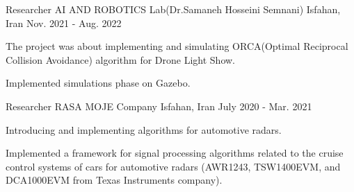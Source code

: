 

\begin{cventries}



  \cventry
    {Researcher} %
    {AI AND ROBOTICS Lab(Dr.‪Samaneh Hosseini Semnani)} %
    {Isfahan, Iran} %
    {Nov. 2021 - Aug. 2022} %
    {
      \begin{cvitems} %
        \item {The project was about implementing and simulating ORCA(Optimal Reciprocal Collision Avoidance) algorithm for Drone Light Show.}
        \item {Implemented simulations phase on Gazebo.}
      \end{cvitems}
    }
  \cventry
    {Researcher} %
    {RASA MOJE Company} %
    {Isfahan, Iran} %
    {July 2020 - Mar. 2021} %
    {
      \begin{cvitems} %
        \item {Introducing and implementing algorithms for automotive radars.}
        \item {Implemented a framework for signal processing algorithms related to the cruise control systems of cars for automotive radars (AWR1243, TSW1400EVM, and DCA1000EVM from Texas Instruments company).}
      \end{cvitems}
    }
 
\end{cventries}
